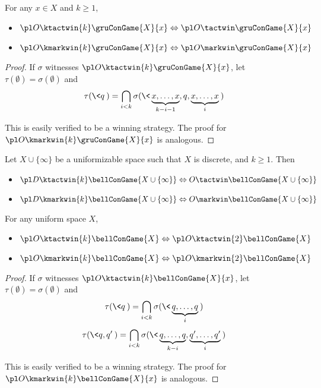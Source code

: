\begin{prop} For any $x\in X$ and $k\geq 1$,
  \begin{itemize}
    \item
      $\pl O\ktactwin{k}\gruConGame{X}{x} \Leftrightarrow \pl O\tactwin\gruConGame{X}{x}$
    \item
      $\pl O\kmarkwin{k}\gruConGame{X}{x} \Leftrightarrow \pl O\markwin\gruConGame{X}{x}$
  \end{itemize}
\end{prop}

\begin{proof}
  If $\sigma$ witnesses $\pl O\ktactwin{k}\gruConGame{X}{x}$, let $\tau(\emptyset)=\sigma(\emptyset)$ and
    \[
      \tau(\<q\>)
        =
      \bigcap_{i< k}
      \sigma(\<\underbrace{x,\dots,x}_{k-i-1},q,\underbrace{x,\dots,x}_{i}\>)
    \]

  This is easily verified to be a winning strategy. The proof for $\pl O\kmarkwin{k}\gruConGame{X}{x}$ is analogous.
\end{proof}

\begin{cor}
  Let $X\cup\{\infty\}$ be a uniformizable space such that $X$ is discrete, and $k\geq 1$. Then
  \begin{itemize}
    \item
      $\pl D\ktactwin{k}\bellConGame{X\cup\{\infty\}} \Leftrightarrow O\tactwin\bellConGame{X\cup\{\infty\}}$
    \item
      $\pl D\kmarkwin{k}\bellConGame{X\cup\{\infty\}} \Leftrightarrow O\markwin\bellConGame{X\cup\{\infty\}}$
  \end{itemize}
\end{cor}

\begin{prop} For any uniform space $X$,
  \begin{itemize}
    \item
      $\pl O\ktactwin{k}\bellConGame{X} \Leftrightarrow \pl O\ktactwin{2}\bellConGame{X}$
    \item
      $\pl O\kmarkwin{k}\bellConGame{X} \Leftrightarrow \pl O\kmarkwin{2}\bellConGame{X}$
  \end{itemize}
\end{prop}

\begin{proof}
  If $\sigma$ witnesses $\pl O\ktactwin{k}\bellConGame{X}{x}$, let $\tau(\emptyset)=\sigma(\emptyset)$ and
    \[
      \tau(\<q\>)
        =
      \bigcap_{i<k}
      \sigma(\<\underbrace{q,\dots,q}_{i}\>)
    \]
    \[
      \tau(\<q,q'\>)
        =
      \bigcap_{i< k}
      \sigma(\<\underbrace{q,\dots,q}_{k-i},\underbrace{q',\dots,q'}_{i}\>)
    \]

  This is easily verified to be a winning strategy. The proof for $\pl O\kmarkwin{k}\bellConGame{X}{x}$ is analogous.
\end{proof}

